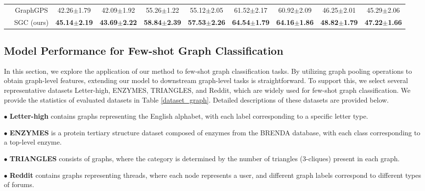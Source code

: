 \begin{table*}[ht]
{\begin{tabular}{@{}c|c|cccccccc@{}}
                      & GraphGPS                  & 42.26$\pm$1.79                    & 42.09$\pm$1.92                    & 55.26$\pm$1.22                    & 55.12$\pm$2.05                    & 61.52$\pm$2.17                    & 60.92$\pm$2.09                   & 46.25$\pm$2.01                    & 45.29$\pm$2.06                   \\
                      & SGC (ours)                & \textbf{45.14$\pm$2.19}           & \textbf{43.69$\pm$2.22}           & \textbf{58.84$\pm$2.39}           & \textbf{57.53$\pm$2.26}           & \textbf{64.54$\pm$1.79}           & \textbf{64.16$\pm$1.86}          & \textbf{48.82$\pm$1.79}           & \textbf{47.22$\pm$1.66}          \\ \bottomrule
\end{tabular} %
}
\end{table*}

\subsection{Model Performance for Few-shot Graph Classification}
In this section, we explore the application of our method to few-shot graph classification tasks. By utilizing graph pooling operations to obtain graph-level features, extending our model to downstream graph-level tasks is straightforward. To support this, we select several representative datasets Letter-high, ENZYMES, TRIANGLES, and Reddit, which are widely used for few-shot graph classification. We provide the statistics of evaluated datasets in Table \ref{dataset_graph}. Detailed descriptions of these datasets are provided below. 

\noindent $\bullet$ \textbf{Letter-high} contains graphs representing the English alphabet, with each label corresponding to a specific letter type.

\noindent $\bullet$ \textbf{ENZYMES} is a protein tertiary structure dataset composed of enzymes from the BRENDA database, with each class corresponding to a top-level enzyme.

\noindent $\bullet$ \textbf{TRIANGLES} consists of graphs, where the category is determined by the number of triangles (3-cliques) present in each graph.

\noindent $\bullet$ \textbf{Reddit} contains graphs representing threads, where each node represents a user, and different graph labels correspond to different types of forums.

